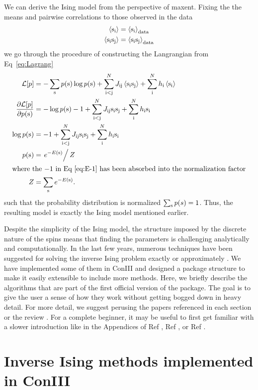 \documentclass{jors}
\begin{document}
We can derive the Ising model from the perspective of maxent. Fixing the the means and pairwise correlations to those observed in the data
\begin{align}
	\left<{\rm s}_{\rm i}\right> &= \left<{\rm s}_{\rm i}\right>_{\rm data} \\
	\left<{\rm s}_{\rm i}{\rm s}_{\rm j}\right> &= \left<{\rm s}_{\rm i}{\rm s}_{\rm j}\right>_{\rm data}
\end{align}
we go through the procedure of constructing the Langrangian from Eq~\ref{eq:Lagrang}
\begin{align}
	\mathcal{L}[p] &= -\sum_{\rm s} p({\rm s})\log p({\rm s}) +\sum_{\rm i<j}^N J_{\rm ij}\left<{\rm s}_{\rm i}{\rm s}_{\rm j}\right> +\sum_{\rm i}^Nh_{\rm i}\left<{\rm s}_{\rm i}\right>\\
	\frac{\partial\mathcal{L}[p]}{\partial p({\rm s})} &= -\log p({\rm s})-1 +\sum_{\rm i<j}^N J_{\rm ij}{\rm s}_{\rm i}{\rm s}_{\rm j} +\sum_{\rm i}^Nh_{\rm i}{\rm s}_{\rm i}\\
	\log p({\rm s}) &= -1 +\sum_{\rm i<j}^N J_{\rm ij}{\rm s}_{\rm i}{\rm s}_{\rm j} +\sum_{\rm i}^Nh_{\rm i}{\rm s}_{\rm i}\label{eq:E-1}\\
	p({\rm s}) &= \left.e^{-E({\rm s})}\right/Z\\
\intertext{where the $-1$ in Eq \ref{eq:E-1} has been absorbed into the normalization factor}
	Z &= \sum_{{\rm s}} e^{-E({\rm s})}.
\end{align}
such that the probability distribution is normalized $\sum_{{\rm s}} p(s)=1$.
Thus, the resulting model is exactly the Ising model mentioned earlier.

Despite the simplicity of the Ising model, the structure imposed by the discrete nature of the spins means that finding the parameters is challenging analytically and computationally. In the last few years, numerous techniques have been suggested for solving the inverse Ising problem exactly or approximately \cite{Nguyen:2017ww}. We have implemented some of them in ConIII and designed a package structure to make it easily extensible to include more methods.  Here, we briefly describe the algorithms that are part of the first official version of the package. The goal is to give the user a sense of how they work without getting bogged down in heavy detail. For more detail, we suggest perusing the papers referenced in each section or the review \cite{Nguyen:2017ww}. For a complete beginner, it may be useful to first get familiar with a slower introduction like in the Appendices of Ref \cite{Lee:2015ev}, Ref \cite{Bialek:2012ueb}, or Ref \cite{Bretthorst:2003ua}.



\section*{Inverse Ising methods implemented in ConIII}
\end{document}
